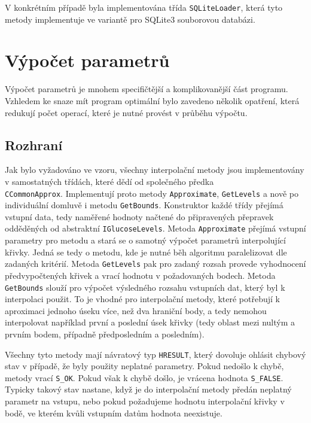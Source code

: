 \documentclass[]{thesiskiv}
\begin{document}
V konkrétním případě byla implementována třída \texttt{SQLiteLoader}, která tyto metody implementuje ve variantě pro SQLite3 souborovou databázi.

\section{Výpočet parametrů}

Výpočet parametrů je mnohem specifičtější a komplikovanější část programu. Vzhledem ke snaze mít program optimální bylo zavedeno několik opatření, která redukují počet operací, které je nutné provést v průběhu výpočtu.

\subsection{Rozhraní}

Jak bylo vyžadováno ve vzoru, všechny interpolační metody jsou implementovány v samostatných třídách, které dědí od společného předka\\ \texttt{CCommonApprox}. Implementují proto metody \texttt{Approximate}, \texttt{GetLevels} a nově po individuální domluvě i metodu \texttt{GetBounds}. Konstruktor každé třídy přejímá vstupní data, tedy naměřené hodnoty načtené do připravených přepravek odděděných od abstraktní \texttt{IGlucoseLevels}. Metoda \texttt{Approximate} přejímá vstupní parametry pro metodu a stará se o samotný výpočet parametrů interpolující křivky. Jedná se tedy o metodu, kde je nutné běh algoritmu paralelizovat dle zadaných kritérií. Metoda \texttt{GetLevels} pak pro zadaný rozsah provede vyhodnocení předvypočtených křivek a vrací hodnotu v požadovaných bodech. Metoda \texttt{GetBounds} slouží pro výpočet výsledného rozsahu vstupních dat, který byl k interpolaci použit. To je vhodné pro interpolační metody, které potřebují k aproximaci jednoho úseku více, než dva hraniční body, a tedy nemohou interpolovat například první a poslední úsek křivky (tedy oblast mezi nultým a prvním bodem, případně předposledním a posledním).

Všechny tyto metody mají návratový typ \texttt{HRESULT}, který dovoluje ohlásit chybový stav v případě, že byly použity neplatné parametry. Pokud nedošlo k chybě, metody vrací \texttt{S\_OK}. Pokud však k chybě došlo, je vrácena hodnota \texttt{S\_FALSE}. Typicky takový stav nastane, když je do interpolační metody předán neplatný parametr na vstupu, nebo pokud požadujeme hodnotu interpolační křivky v bodě, ve kterém kvůli vstupním datům hodnota neexistuje.
\end{document}
